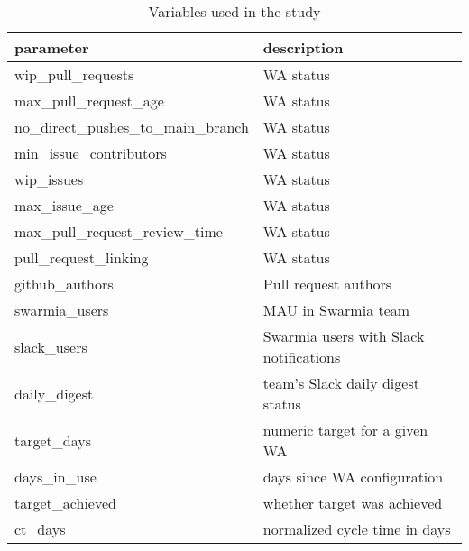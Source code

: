 \begin{table}
\begin{center}
\begin{tabularx}{\textwidth}{|l|l|} 
\hline
parameter & description\\ [0.5ex] 
\hline\hline
wip\_pull\_requests & WA status \\
max\_pull\_request\_age & WA status \\
no\_direct\_pushes\_to\_main\_branch & WA status \\
min\_issue\_contributors  & WA status \\
wip\_issues & WA status \\
max\_issue\_age  & WA status \\
max\_pull\_request\_review\_time  & WA status \\
pull\_request\_linking  & WA status \\
github\_authors & Pull request authors \\
swarmia\_users & MAU in Swarmia team \\
slack\_users & Swarmia users with Slack notifications \\
daily\_digest & team's Slack daily digest status \\
target\_days & numeric target for a given WA \\
days\_in\_use & days since WA configuration \\
target\_achieved & whether target was achieved \\
ct\_days  & normalized cycle time in days \\

\hline
\end{tabularx}
\caption{Variables used in the study}
\label{tab:variables}
\end{center}
\end{table}


